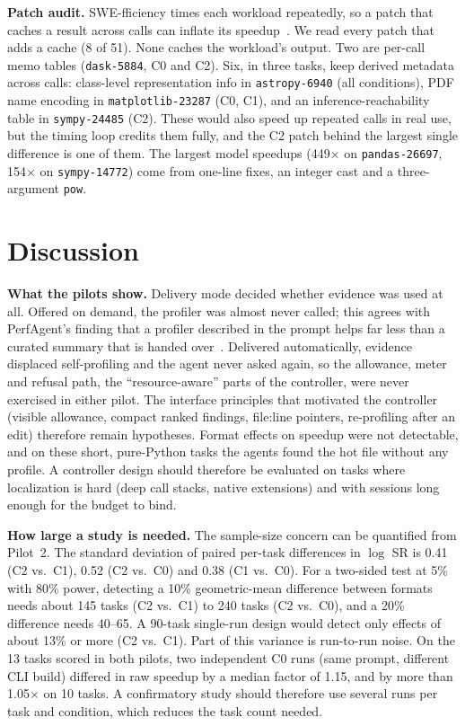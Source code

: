\documentclass[conference]{IEEEtran}
\begin{document}
\textbf{Patch audit.} SWE-fficiency times each workload repeatedly, so a patch
that caches a result across calls can inflate its
speedup~\cite{deng2026perfagent}. We read every patch that adds a cache
(8 of 51). None caches the workload's output. Two are per-call memo tables
(\texttt{dask-5884}, C0 and C2). Six, in three tasks, keep derived metadata
across calls:
class-level representation info in \texttt{astropy-6940} (all conditions),
PDF name encoding in \texttt{matplotlib-23287} (C0, C1), and an
inference-reachability table in \texttt{sympy-24485} (C2). These would also
speed up repeated calls in real use, but the timing loop credits them fully,
and the C2 patch behind the largest single difference is one of them. The
largest model speedups (449$\times$ on \texttt{pandas-26697}, 154$\times$ on
\texttt{sympy-14772}) come from one-line fixes, an integer cast and a
three-argument \texttt{pow}.

\section{Discussion}
\label{sec:discussion}

\textbf{What the pilots show.} Delivery mode decided whether evidence was
used at all. Offered on demand, the profiler was almost never called; this
agrees with PerfAgent's finding that a profiler described in the prompt helps
far less than a curated summary that is handed over~\cite{deng2026perfagent}.
Delivered automatically, evidence displaced self-profiling and the agent
never asked again, so the allowance, meter and refusal path, the
``resource-aware'' parts of the controller, were never exercised in either
pilot. The interface principles that motivated the controller (visible
allowance, compact ranked findings, file:line pointers, re-profiling after an
edit) therefore remain hypotheses. Format effects on speedup were not
detectable, and on these short,
pure-Python tasks the agents found the hot file without any profile. A
controller design should therefore be evaluated on tasks where localization
is hard (deep call stacks, native extensions) and with sessions long enough
for the budget to bind.

\textbf{How large a study is needed.} The sample-size concern can be
quantified from Pilot~2. The standard deviation of paired per-task
differences in $\log$ SR is 0.41 (C2 vs.\ C1), 0.52 (C2 vs.\ C0) and 0.38 (C1
vs.\ C0). For a two-sided test at 5\% with 80\% power, detecting a 10\%
geometric-mean difference between formats needs about 145 tasks (C2 vs.\ C1)
to 240 tasks (C2 vs.\ C0), and a 20\% difference needs 40--65. A 90-task
single-run design would detect only effects of about 13\% or more (C2 vs.\
C1). Part of this variance is run-to-run noise. On the 13 tasks scored in
both pilots, two independent C0 runs (same prompt, different CLI build)
differed in raw speedup by a median factor of 1.15, and by more than
1.05$\times$ on 10 tasks. A confirmatory study should therefore use several
runs per task and condition, which reduces the task count needed.
\end{document}
